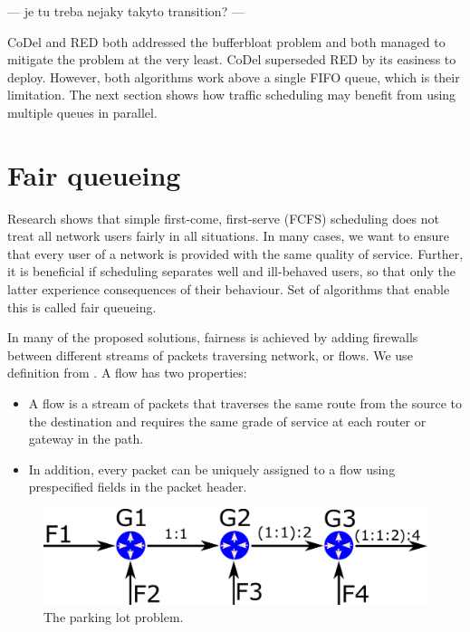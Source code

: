 --- je tu treba nejaky takyto transition? ---
 
CoDel and RED both addressed the bufferbloat problem and both managed to mitigate the problem at the very least. CoDel superseded RED by its easiness to deploy. However, both algorithms work above a single FIFO queue, which is their limitation. The next section shows how traffic scheduling may benefit from using multiple queues in parallel.

\section{Fair queueing}
\label{sec:fair_queueing}
Research shows that simple first-come, first-serve (FCFS) scheduling does not treat all network users fairly in all situations. In many cases, we want to ensure that every user of a network is provided with the same quality of service. Further, it is beneficial if scheduling separates well and ill-behaved users, so that only the latter experience consequences of their behaviour. Set of algorithms that enable this is called fair queueing.

In many of the proposed solutions, fairness is achieved by adding firewalls between different streams of packets traversing network, or flows. We use definition from \cite{Zhang:1990:VCN:99517.99525}. A flow has two properties:
\begin{itemize}
	\item A flow is a stream of packets that traverses the same route from the source to the destination and requires the same grade of service at each router or gateway in the path.
	\item In addition, every packet can be uniquely assigned to a flow using prespecified fields in the packet header.
\end{itemize}
 
\begin{figure}
	\centering
	\includegraphics[width=137mm]{drawings/parking_lot}
	\caption{The parking lot problem.}
	
	\label{fig05:ParkingLot}
\end{figure}

